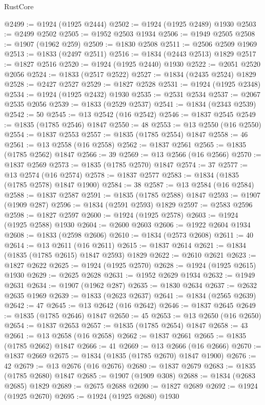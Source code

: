 \begin{lexlean}{RustCore}
\begin{coremodule}
@2499 := @1924 (@1925 @2444)
@2502 := @1924 (@1925 @2489) @1930
@2503 := @2499 @2502
@2505 := @1952 @2503 @1934
@2506 := @1949 @2505
@2508 := @1907 (@1962 @259)
@2509 := @1830 @2508
@2511 := @2506 @2509 @1969
@2513 := @1833 (@2497 @2511)
@2516 := @1834 (@2443 @2513) @1829
@2517 := @1827 @2516
@2520 := @1924 (@1925 @2440) @1930
@2522 := @2051 @2520 @2056
@2524 := @1833 (@2517 @2522)
@2527 := @1834 (@2435 @2524) @1829
@2528 := @2427 @2527
@2529 := @1827 @2528
@2531 := @1924 (@1925 @2348)
@2534 := @1924 (@1925 @2432) @1930
@2535 := @2531 @2534
@2537 := @2067 @2535 @2056
@2539 := @1833 (@2529 @2537)
@2541 := @1834 (@2343 @2539)
@2542 := 50
@2545 := @13 @2542 (@16 @2542)
@2546 := @1837 @2545
@2549 := @1835 (@1785 @2546) @1847
@2550 := 48
@2553 := @13 @2550 (@16 @2550)
@2554 := @1837 @2553
@2557 := @1835 (@1785 @2554) @1847
@2558 := 46
@2561 := @13 @2558 (@16 @2558)
@2562 := @1837 @2561
@2565 := @1835 (@1785 @2562) @1847
@2566 := 39
@2569 := @13 @2566 (@16 @2566)
@2570 := @1837 @2569
@2573 := @1835 (@1785 @2570) @1847
@2574 := 37
@2577 := @13 @2574 (@16 @2574)
@2578 := @1837 @2577
@2583 := @1834 (@1835 (@1785 @2578) @1847 @1900)
@2584 := 38
@2587 := @13 @2584 (@16 @2584)
@2588 := @1837 @2587
@2591 := @1835 (@1785 @2588) @1847
@2593 := @1907 (@1909 @287)
@2596 := @1834 (@2591 @2593) @1829
@2597 := @2583 @2596
@2598 := @1827 @2597
@2600 := @1924 (@1925 @2578)
@2603 := @1924 (@1925 @2588) @1930
@2604 := @2600 @2603
@2606 := @1922 @2604 @1934
@2608 := @1833 (@2598 @2606)
@2610 := @1834 (@2573 @2608)
@2611 := 40
@2614 := @13 @2611 (@16 @2611)
@2615 := @1837 @2614
@2621 := @1834 (@1835 (@1785 @2615) @1847 @2593) @1829
@2622 := @2610 @2621
@2623 := @1827 @2622
@2625 := @1924 (@1925 @2570)
@2628 := @1924 (@1925 @2615) @1930
@2629 := @2625 @2628
@2631 := @1952 @2629 @1934
@2632 := @1949 @2631
@2634 := @1907 (@1962 @287)
@2635 := @1830 @2634
@2637 := @2632 @2635 @1969
@2639 := @1833 (@2623 @2637)
@2641 := @1834 (@2565 @2639)
@2642 := 47
@2645 := @13 @2642 (@16 @2642)
@2646 := @1837 @2645
@2649 := @1835 (@1785 @2646) @1847
@2650 := 45
@2653 := @13 @2650 (@16 @2650)
@2654 := @1837 @2653
@2657 := @1835 (@1785 @2654) @1847
@2658 := 43
@2661 := @13 @2658 (@16 @2658)
@2662 := @1837 @2661
@2665 := @1835 (@1785 @2662) @1847
@2666 := 41
@2669 := @13 @2666 (@16 @2666)
@2670 := @1837 @2669
@2675 := @1834 (@1835 (@1785 @2670) @1847 @1900)
@2676 := 42
@2679 := @13 @2676 (@16 @2676)
@2680 := @1837 @2679
@2683 := @1835 (@1785 @2680) @1847
@2685 := @1907 (@1909 @308)
@2688 := @1834 (@2683 @2685) @1829
@2689 := @2675 @2688
@2690 := @1827 @2689
@2692 := @1924 (@1925 @2670)
@2695 := @1924 (@1925 @2680) @1930

\end{coremodule}
\end{lexlean}

